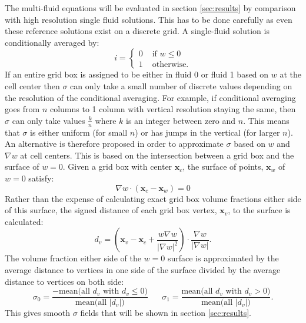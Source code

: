 \documentclass[draft]{agujournal2019}
\begin{document}
The multi-fluid equations will be evaluated in section \ref{sec:results} by comparison with high resolution single fluid solutions. This has to be done carefully as even these reference solutions exist on a discrete grid. A single-fluid solution is conditionally averaged by:
\begin{equation}
i =
\begin{cases}
    0 & \text{ if }w\le 0 \\
    1 & \text{ otherwise.}
\end{cases}
\end{equation}
If an entire grid box is assigned to be either in fluid 0 or fluid 1 based on $w$ at the cell center then $\sigma$ can only take a small number of discrete values depending on the resolution of the conditional averaging. For example, if conditional averaging goes from $n$ columns to 1 column with vertical resolution staying the same, then $\sigma$ can only take values $\frac{k}{n}$ where $k$ is an integer between zero and $n$. This means that $\sigma$ is either uniform (for small $n$) or has jumps in the vertical (for larger $n$). An alternative is therefore proposed in order to approximate $\sigma$ based on $w$ and $\nabla w$ at cell centers. This is based on the intersection between a grid box and the surface of $w=0$. Given a grid box with center $\mathbf{x}_c$, the surface of points, $\mathbf{x}_w$ of $w=0$ satisfy:
\begin{equation}
\nabla w \cdot \left(\mathbf{x}_c - \mathbf{x}_w\right) = 0
\end{equation}
Rather than the expense of calculating exact grid box volume fractions either side of this surface, the signed distance of each grid box vertex, $\mathbf{x}_v$, to the surface is calculated:
\begin{equation}
d_v = \left(
     \mathbf{x}_v - \mathbf{x}_c + \frac{w \nabla w}{|\nabla w|^2} 
\right) \cdot \frac{\nabla w}{|\nabla w|}.
\end{equation}
The volume fraction either side of the $w=0$ surface is approximated by the average distance to vertices in one side of the surface divided by the average distance to vertices on both side:
\begin{equation}
\sigma_0 = 
\frac{-\text{mean}\bigl(\text{all } d_v \text{ with } d_v \le 0\bigr)}
{\text{mean}\bigl(\text{all } |d_v| \bigl)}
\;\;\;\;\;\;
\sigma_1 = 
\frac{\text{mean}\bigl(\text{all } d_v \text{ with } d_v > 0\bigr)}
{\text{mean}\bigl(\text{all } |d_v| \bigl)}.
\end{equation}
This gives smooth $\sigma$ fields that will be shown in section \ref{sec:results}.
\end{document}
